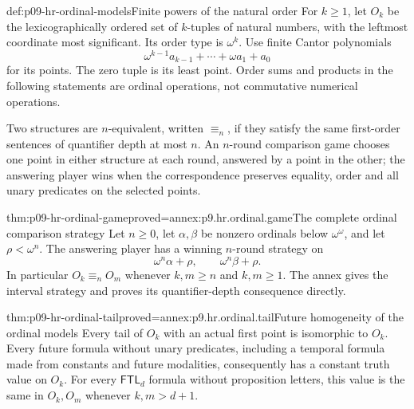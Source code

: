 \begin{hbdefinition}{def:p09-hr-ordinal-models}{Finite powers of the natural order}
For \(k\geq1\), let \(O_k\) be the lexicographically ordered
set of \(k\)-tuples of natural numbers, with the leftmost
coordinate most significant. Its order type is \(\omega^k\).
Use finite Cantor polynomials
\[
                 \omega^{k-1}a_{k-1}+\cdots+\omega a_1+a_0
\]
for its points. The zero tuple is its least point.
Order sums and products in the following statements are ordinal
operations, not commutative numerical operations.

Two structures are \(n\)-equivalent, written \(\equiv_n\),
if they satisfy the same first-order sentences of quantifier
depth at most \(n\). An \(n\)-round comparison game chooses
one point in either structure at each round, answered by a
point in the other; the answering player wins when the
correspondence preserves equality, order and all unary
predicates on the selected points.
\end{hbdefinition}

\begin{hblemma}{thm:p09-hr-ordinal-game}{proved=annex:p9.hr.ordinal.game}{The complete ordinal comparison strategy}
Let \(n\geq0\), let \(\alpha,\beta\) be nonzero ordinals
below \(\omega^\omega\), and let \(\rho<\omega^n\).
The answering player has a winning \(n\)-round strategy on
\[
                   \omega^n\alpha+\rho,\qquad
                   \omega^n\beta+\rho.
\]
In particular \(O_k\equiv_n O_m\) whenever \(k,m\geq n\)
and \(k,m\geq1\). The annex gives the interval strategy
and proves its quantifier-depth consequence directly.
\end{hblemma}

\begin{hblemma}{thm:p09-hr-ordinal-tail}{proved=annex:p9.hr.ordinal.tail}{Future homogeneity of the ordinal models}
Every tail of \(O_k\) with an actual first point is isomorphic
to \(O_k\). Every future formula without unary predicates,
including a temporal formula made from constants and future
modalities, consequently has a constant truth value on \(O_k\).
For every \(\mathsf{FTL}_d\) formula without proposition
letters, this value is the same in \(O_k,O_m\) whenever
\(k,m>d+1\).
\end{hblemma}

